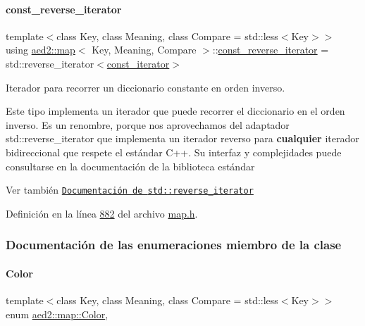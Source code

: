 \paragraph{\texorpdfstring{const\+\_\+reverse\+\_\+iterator}{const\_reverse\_iterator}}
{\footnotesize\ttfamily template$<$class Key, class Meaning, class Compare = std\+::less$<$\+Key$>$$>$ \\
using \hyperlink{classaed2_1_1map}{aed2\+::map}$<$ Key, Meaning, Compare $>$\+::\hyperlink{classaed2_1_1map_aed66a216549d13078a3ea6978ea0b768_aed66a216549d13078a3ea6978ea0b768}{const\+\_\+reverse\+\_\+iterator} =  std\+::reverse\+\_\+iterator$<$\hyperlink{classaed2_1_1map_1_1const__iterator}{const\+\_\+iterator}$>$}



Iterador para recorrer un diccionario constante en orden inverso. 

Este tipo implementa un iterador que puede recorrer el diccionario en el orden inverso. Es un renombre, porque nos aprovechamos del adaptador {\ttfamily std\+::reverse\+\_\+iterator} que implementa un iterador reverso para {\bfseries cualquier} iterador bidireccional que respete el estándar C++. Su interfaz y complejidades puede consultarse en la documentación de la biblioteca estándar

\begin{DoxySeeAlso}{Ver también}
\href{http://en.cppreference.com/w/cpp/iterator/reverse_iterator}{\tt Documentación de {\ttfamily std\+::reverse\+\_\+iterator}} 
\end{DoxySeeAlso}


Definición en la línea \hyperlink{map_8h_source_l00882}{882} del archivo \hyperlink{map_8h_source}{map.\+h}.



\subsubsection{Documentación de las enumeraciones miembro de la clase}
\mbox{\label{classaed2_1_1map_a6d62a415a4b9d320b30cada4ebcf9f5b_a6d62a415a4b9d320b30cada4ebcf9f5b}} 
\paragraph{\texorpdfstring{Color}{Color}}
{\footnotesize\ttfamily template$<$class Key, class Meaning, class Compare = std\+::less$<$\+Key$>$$>$ \\
enum \hyperlink{classaed2_1_1map_a6d62a415a4b9d320b30cada4ebcf9f5b_a6d62a415a4b9d320b30cada4ebcf9f5b}{aed2\+::map\+::\+Color}\hspace{0.3cm}{\ttfamily [strong]}, {\ttfamily [private]}}



